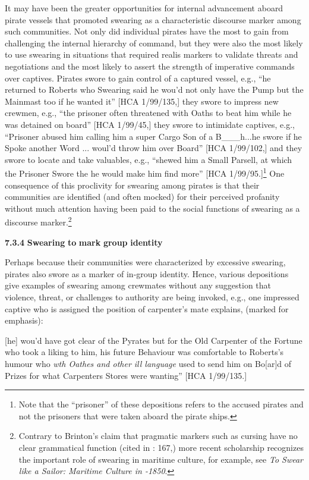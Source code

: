   It may have been the greater opportunities for internal advancement aboard pirate vessels that promoted swearing as a characteristic discourse marker among such communities. Not only did individual pirates have the most to gain from challenging the internal hierarchy of command, but they were also the most likely to use swearing in situations that required realis markers to validate threats and negotiations and the most likely to assert the strength of imperative commands over captives. Pirates swore to gain control of a captured vessel, e.g., “he returned to Roberts who Swearing said he wou’d not only have the Pump but the Mainmast too if he wanted it” [HCA 1/99/135,] they swore to impress new crewmen, e.g., “the prisoner often threatened with Oaths to beat him while he was detained on board” [HCA 1/99/45,] they swore to intimidate captives, e.g., “Prisoner abused him calling him a super Cargo Son of a B\_\_\_h...he swore if he Spoke another Word ... woul’d throw him over Board” [HCA 1/99/102,] and they swore to locate and take valuables, e.g., “shewed him a Small Parsell, at which the Prisoner Swore the he would make him find more” [HCA 1/99/95.]\footnote{Note that the “prisoner” of these depositions refers to the accused pirates and not the prisoners that were taken aboard the pirate ships.}  One consequence of this proclivity for swearing among pirates is that their communities are identified (and often mocked) for their perceived profanity without much attention having been paid to the social functions of swearing as a discourse marker.\footnote{Contrary to Brinton’s claim that pragmatic markers such as cursing have no clear grammatical function (cited in \citealt{ClaridgeArnovick2010}: 167,) more recent scholarship recognizes the important role of swearing in maritime culture, for example, see  \textit{To Swear like a Sailor: Maritime Culture in \citealt{America1750}-1850}.} 

  \textbf{7.3.4} \textbf{Swearing} \textbf{to} \textbf{mark} \textbf{group} \textbf{identity}

Perhaps because their communities were characterized by excessive swearing, pirates also swore as a marker of in-group identity. Hence, various depositions give examples of swearing among crewmates without any suggestion that violence, threat, or challenges to authority are being invoked, e.g., one impressed captive who is assigned the position of carpenter’s mate explains, (marked for emphasis): 

[he] wou’d have got clear of the Pyrates but for the Old Carpenter of the Fortune who took a liking to him, his future Behaviour was comfortable to Roberts’s humour who \textit{wth Oathes and other ill language} used to send him on Bo[ar]d of Prizes for what Carpenters Stores were wanting” [HCA 1/99/135.] 

